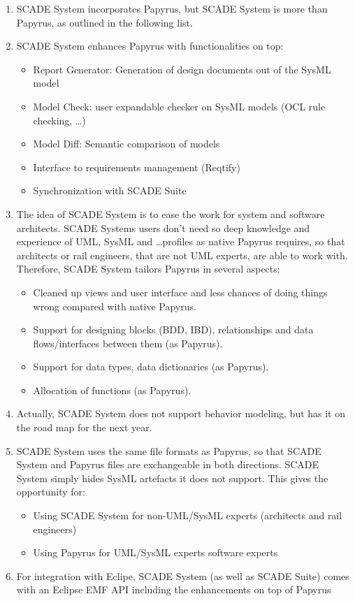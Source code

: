 \begin{enumerate}
	\item SCADE System incorporates Papyrus, but SCADE System is more than Papyrus, as outlined in the following list. 
	\item SCADE System enhances Papyrus with functionalities on top: 
	
	\begin{itemize}
		\item Report Generator: Generation of design documents out of the SysML model
		\item Model Check: user expandable checker on SysML models (OCL rule checking, …)
		\item Model Diff: Semantic comparison of models
		\item Interface to requirements management (Reqtify)
		\item Synchronization with SCADE Suite
	\end{itemize}
	
	\item The idea of SCADE System is to ease the work for system and software architects.  SCADE Systems users don’t need so deep knowledge and experience of UML, SysML and …profiles as native Papyrus requires, so that architects or rail engineers, that are not UML experts, are able to work with. Therefore, SCADE System tailors Papyrus in several aspects:
	
	\begin{itemize}
		\item Cleaned up views and user interface and less chances of doing things wrong compared with native Papyrus.
		\item Support for designing blocks (BDD, IBD), relationships and data flows/interfaces between them (as Papyrus).
		\item Support for data types, data dictionaries (as Papyrus).
		\item Allocation of functions (as Papyrus).
	\end{itemize}
	
	\item Actually, SCADE System does not support behavior modeling, but has it on the road map for the next year.
	\item SCADE System uses the same file formats as Papyrus, so that SCADE System and Papyrus files are exchangeable in both directions. SCADE System simply hides SysML artefacts it does not support. This gives the opportunity for:
	
	\begin{itemize}
		\item Using SCADE System for non-UML/SysML experts (architects and rail engineers)
		\item Using Papyrus for UML/SysML experts software experts
	\end{itemize}
	
	\item For integration with Eclipe, SCADE System (as well as SCADE Suite) comes with an Eclipse EMF API including the enhancements on top of Papyrus
\end{enumerate}

